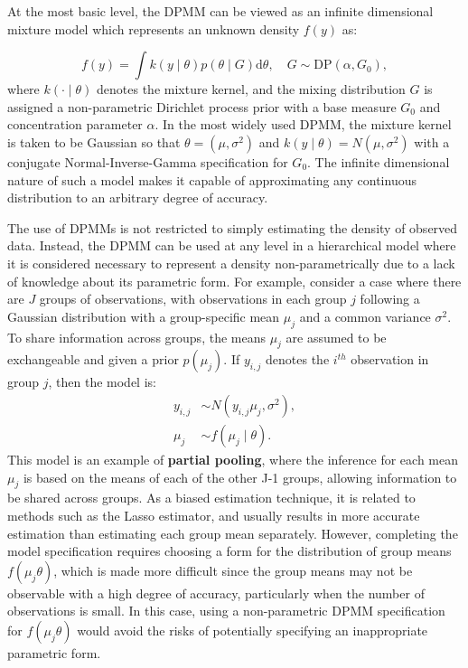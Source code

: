 \documentclass[nojss]{jss}
\begin{document}
At the most basic level, the DPMM can be viewed as an infinite dimensional mixture model which represents an unknown density $f(y)$ as:

\begin{equation}
f(y) = \int k(y \mid \theta) p(\theta \mid G) \mathrm{d} \theta, \quad G \sim \text{DP}(\alpha, G_0),
\end{equation}
where $k(\cdot \mid \theta)$ denotes the mixture kernel, and the mixing distribution $G$ is assigned a non-parametric Dirichlet process prior with a base measure $G_0$ and concentration parameter $\alpha$. In the most widely used DPMM, the mixture kernel is taken to be Gaussian so that $\theta = (\mu,\sigma^2)$ and $k(y\mid\theta) = N(\mu,\sigma^2)$ with a conjugate Normal-Inverse-Gamma specification for $G_0$. The infinite dimensional nature of such a model makes it capable of approximating any continuous distribution to an arbitrary degree of accuracy.

The use of DPMMs is not restricted to simply estimating the density of observed data. Instead, the DPMM can be used at any level in a hierarchical model where it is considered necessary to represent a density non-parametrically due to a lack of knowledge about its parametric form. For example, consider a case where there are $J$ groups of observations, with observations in each group $j$ following a Gaussian distribution with a group-specific mean $\mu_j$ and a common variance $\sigma^2$. To share information across groups, the means $\mu_j$ are assumed to be exchangeable and given a prior $p(\mu_j)$. If $y_{i,j}$ denotes the $i^{th}$ observation in group $j$, then the model is:
\begin{align*}
y_{i,j} & \sim N(y_{i,j}\mu_j,\sigma^2), \\
\mu_j & \sim f(\mu_j \mid \theta).
\end{align*}
This model is an example of \textbf{partial pooling}, where the inference for each mean $\mu_j$ is based on the means of each of the other J-1 groups, allowing information to be shared across groups. As a biased estimation technique, it is related to methods such as the Lasso estimator, and usually results in more accurate estimation than estimating each group mean separately. However, completing the model specification requires choosing a form for the distribution of group means $f(\mu_j \theta) $, which is made more difficult since the group means may not be observable with a high degree of accuracy, particularly when the number of observations is small. In this case, using a non-parametric DPMM specification for $f(\mu_j \theta) $ would avoid the risks of potentially specifying an inappropriate parametric form.
\end{document}

